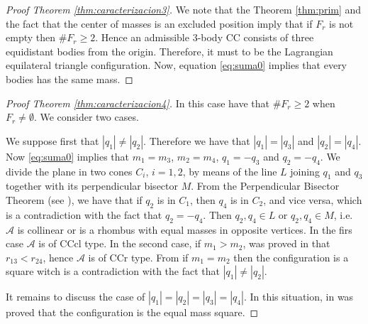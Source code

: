 \documentclass[twoside]{article}
\theoremstyle{remark}
\begin{document}
\begin{proof}[Proof Theorem \ref{thm:caracterizacion3}]
We note that the Theorem \ref{thm:prim} and the fact that the center of masses is an excluded position imply that if $F_r$ is not empty then $\# F_r\geq 2$. Hence an admissible 3-body CC consists of three equidistant bodies from the origin. Therefore, it must to be the Lagrangian equilateral triangle configuration. Now, equation \eqref{eq:suma0} implies that every bodies has the same mass.
\end{proof}



\begin{proof}[Proof Theorem \ref{thm:caracterizacion4}]
In this case have  that $\# F_r\geq 2$ when $F_r\neq \emptyset$.  We consider two cases.

We suppose first that  $|q_1|\neq|q_2|$.  Therefore we have that $|q_1|=|q_3|$ and $|q_2|=|q_4|$. Now \eqref{eq:suma0} implies that
 $m_1=m_3$, $m_2=m_4$, $q_1=-q_3$ and $q_2=-q_4$.  We divide the plane in two cones $C_i$, $i=1,2$, by means of  the line $L$ joining $q_1$  and $q_3$ together with its perpendicular bisector $M$.  From the Perpendicular Bisector Theorem (see \cite{moeckel1990central}), we have that if  $q_2$  is in $C_1$, then  $q_4$ is in $C_2$, and vice versa, which is a contradiction with the fact that $q_2=-q_4$. Then $q_2,q_4\in L$ or $q_2,q_4\in M$, i.e. $\mathcal{A}$ is collinear or is a rhombus with equal masses in opposite vertices. In the firs case $\mathcal{A}$ is of  CCcl type. In the second case, if $m_1>m_2$,   was proved in \cite[Eqs. $(3.44)$ and $(3.45)$]{long2002four} that $r_{13}<r_{24}$, hence $\mathcal{A}$ is of  CCr type. From \cite[Corollary 2]{perez2007convex} if $m_1=m_2$ then the configuration is a square witch is a contradiction with the fact that $|q_1|\neq|q_2|$.
 
 It remains to discuss the case of $|q_1|=|q_2|=|q_3|=|q_4|$. In this situation, in \cite{hampton2005co} was proved that the configuration is the equal mass square.
\end{proof}
\end{document}
